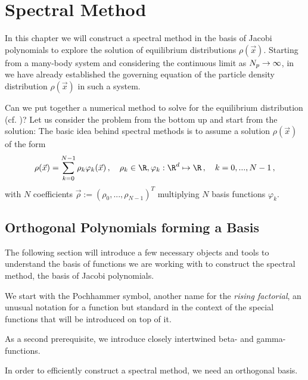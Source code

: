 \chapter{Spectral Method}
\label{chap:spectral-method}

% 

In this chapter we will construct a spectral method in the basis of Jacobi polynomials to explore the solution of equilibrium distributions $\rho(\vec{x})$.
Starting from a many-body system and considering the continuous limit as $N_p \rightarrow \infty$, in  we have already established the governing equation of the particle density distribution $\rho(\vec{x})$ in such a system.

Can we put together a numerical method to solve for the equilibrium distribution (cf. )?
Let us consider the problem from the bottom up and start from the solution:
The basic idea behind spectral methods is to assume a solution $\rho(\vec{x})$ of the form
$$\rho(\vec{x}) = \sum_{k=0}^{N-1} \rho_k \varphi_k(\vec{x})\,,\quad \rho_k \in \R, \varphi_k: \R^d \mapsto \R\,,\quad k = 0, ..., N-1\,,$$
with $N$ coefficients $\vec{\rho} := \left(\rho_0, ..., \rho_{N-1}\right)^T$ multiplying $N$ basis functions $\varphi_k$.

\section{Orthogonal Polynomials forming a Basis}
The following section will introduce a few necessary objects and tools to understand the basis of functions we are working with to construct the spectral method, the basis of Jacobi polynomials.

We start with the Pochhammer symbol, another name for the \textit{rising factorial}, an unusual notation for a function but standard in the context of the special functions that will be introduced on top of it.


As a second prerequisite, we introduce closely intertwined beta- and gamma-functions.



In order to efficiently construct a spectral method, we need an orthogonal basis.



